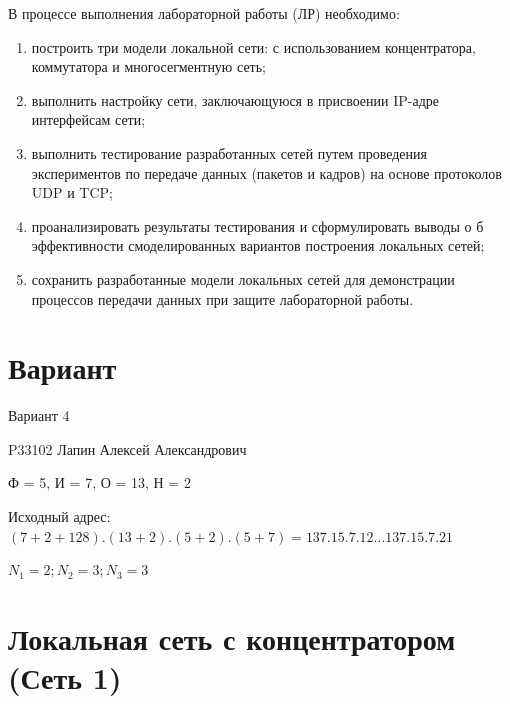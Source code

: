 \documentclass[12pt,onecolumn]{article}
\begin{document}
В процессе выполнения лабораторной работы (ЛР) необходимо:

\begin{enumerate}
    \item построить три модели локальной сети: с использованием концентратора, коммутатора и многосегментную сеть;
    \item выполнить настройку сети, заключающуюся в присвоении IP-адре интерфейсам сети;
    \item выполнить тестирование разработанных сетей путем проведения экспериментов по передаче данных (пакетов и кадров) на основе протоколов UDP и TCP;
    \item проанализировать результаты тестирования и сформулировать выводы о б эффективности смоделированных вариантов построения локальных сетей;
    \item сохранить разработанные модели локальных сетей для демонстрации процессов передачи данных при защите лабораторной работы.
\end{enumerate}
\section*{Вариант}
Вариант 4

P33102 Лапин Алексей Александрович

Ф = 5, И = 7, О = 13, Н = 2

Исходный адрес: $(7 + 2 + 128).(13+2).(5+2).(5+7) = 137.15.7.12 ... 137.15.7.21$

$N_1 = 2; N_2 = 3; N_3 = 3$

\section{Локальная сеть с концентратором (Сеть 1)}
\end{document}
